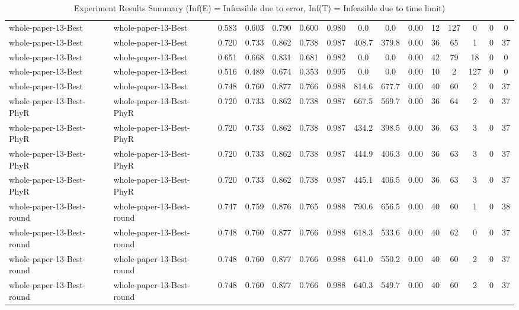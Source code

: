 \begin{table*}[p]
{\begin{tabular}{llccccccccccccc}
      whole-paper-13-Best & whole-paper-13-Best & 0.583 & 0.603 & 0.790 & 0.600 & 0.980 & 0.0 & 0.0 & 0.00 & 12 & 127 & 0 & 0 & 0 \\
      whole-paper-13-Best & whole-paper-13-Best & 0.720 & 0.733 & 0.862 & 0.738 & 0.987 & 408.7 & 379.8 & 0.00 & 36 & 65 & 1 & 0 & 37 \\
      whole-paper-13-Best & whole-paper-13-Best & 0.651 & 0.668 & 0.831 & 0.681 & 0.982 & 0.0 & 0.0 & 0.00 & 42 & 79 & 18 & 0 & 0 \\
      whole-paper-13-Best & whole-paper-13-Best & 0.516 & 0.489 & 0.674 & 0.353 & 0.995 & 0.0 & 0.0 & 0.00 & 10 & 2 & 127 & 0 & 0 \\
      whole-paper-13-Best & whole-paper-13-Best & 0.748 & 0.760 & 0.877 & 0.766 & 0.988 & 814.6 & 677.7 & 0.00 & 40 & 60 & 2 & 0 & 37 \\
      whole-paper-13-Best-PhyR & whole-paper-13-Best-PhyR & 0.720 & 0.733 & 0.862 & 0.738 & 0.987 & 667.5 & 569.7 & 0.00 & 36 & 64 & 2 & 0 & 37 \\
      whole-paper-13-Best-PhyR & whole-paper-13-Best-PhyR & 0.720 & 0.733 & 0.862 & 0.738 & 0.987 & 434.2 & 398.5 & 0.00 & 36 & 63 & 3 & 0 & 37 \\
      whole-paper-13-Best-PhyR & whole-paper-13-Best-PhyR & 0.720 & 0.733 & 0.862 & 0.738 & 0.987 & 444.9 & 406.3 & 0.00 & 36 & 63 & 3 & 0 & 37 \\
      whole-paper-13-Best-PhyR & whole-paper-13-Best-PhyR & 0.720 & 0.733 & 0.862 & 0.738 & 0.987 & 445.1 & 406.5 & 0.00 & 36 & 63 & 3 & 0 & 37 \\
      whole-paper-13-Best-round & whole-paper-13-Best-round & 0.747 & 0.759 & 0.876 & 0.765 & 0.988 & 790.6 & 656.5 & 0.00 & 40 & 60 & 1 & 0 & 38 \\
      whole-paper-13-Best-round & whole-paper-13-Best-round & 0.748 & 0.760 & 0.877 & 0.766 & 0.988 & 618.3 & 533.6 & 0.00 & 40 & 62 & 0 & 0 & 37 \\
      whole-paper-13-Best-round & whole-paper-13-Best-round & 0.748 & 0.760 & 0.877 & 0.766 & 0.988 & 641.0 & 550.2 & 0.00 & 40 & 60 & 2 & 0 & 37 \\
      whole-paper-13-Best-round & whole-paper-13-Best-round & 0.748 & 0.760 & 0.877 & 0.766 & 0.988 & 640.3 & 549.7 & 0.00 & 40 & 60 & 2 & 0 & 37 \\
      \bottomrule
    \end{tabular}%
  }
  \caption{Experiment Results Summary (Inf(E) = Infeasible due to error, Inf(T) = Infeasible due to time limit)}
  \label{tab:experiment-results}
\end{table*}